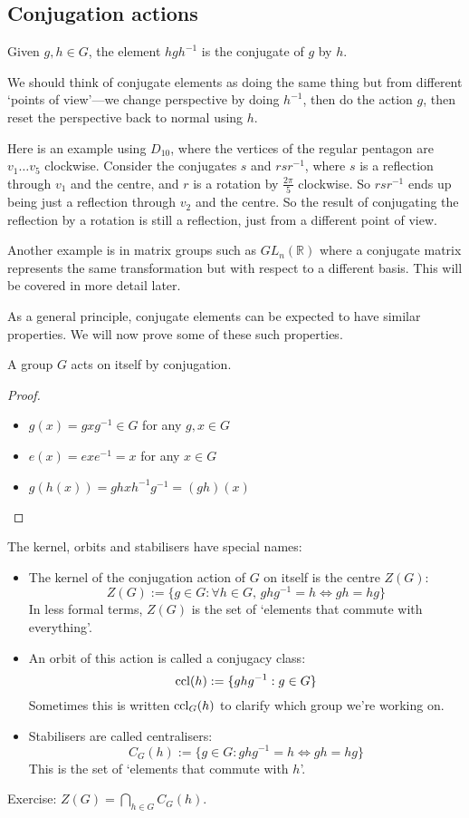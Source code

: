 \subsection{Conjugation actions}
\begin{definition}
	Given \(g, h \in G\), the element \(hgh^{-1}\) is the conjugate of \(g\) by \(h\).
\end{definition}
We should think of conjugate elements as doing the same thing but from different `points of view'---we change perspective by doing \(h^{-1}\), then do the action \(g\), then reset the perspective back to normal using \(h\).

Here is an example using \(D_{10}\), where the vertices of the regular pentagon are \(v_1 \dots v_5\) clockwise.
Consider the conjugates \(s\) and \(rsr^{-1}\), where \(s\) is a reflection through \(v_1\) and the centre, and \(r\) is a rotation by \(\frac{2\pi}{5}\) clockwise.
So \(rsr^{-1}\) ends up being just a reflection through \(v_2\) and the centre.
So the result of conjugating the reflection by a rotation is still a reflection, just from a different point of view.

Another example is in matrix groups such as \(GL_n(\mathbb R)\) where a conjugate matrix represents the same transformation but with respect to a different basis.
This will be covered in more detail later.

As a general principle, conjugate elements can be expected to have similar properties.
We will now prove some of these such properties.
\begin{proposition}
	A group \(G\) acts on itself by conjugation.
\end{proposition}
\begin{proof}
	\begin{itemize}
		\item \(g(x) = gxg^{-1} \in G\) for any \(g, x \in G\)
		\item \(e(x) = exe^{-1} = x\) for any \(x \in G\)
		\item \(g(h(x)) = ghxh^{-1}g^{-1} = (gh)(x)\)
	\end{itemize}
\end{proof}
\begin{definition}
	The kernel, orbits and stabilisers have special names:
	\begin{itemize}
		\item The kernel of the conjugation action of \(G\) on itself is the centre \(Z(G)\):
		      \[
			      Z(G) := \{ g \in G : \forall h \in G,\, ghg^{-1} = h \iff gh=hg \}
		      \]
		      In less formal terms, \(Z(G)\) is the set of `elements that commute with everything'.
		\item An orbit of this action is called a conjugacy class:
		      \[
			      \operatorname{ccl}(h) := \{ ghg^{-1}: g \in G \}
		      \]
		      Sometimes this is written \(\operatorname{ccl}_G(h)\) to clarify which group we're working on.
		\item Stabilisers are called centralisers:
		      \[
			      C_G(h) := \{ g \in G : ghg^{-1} = h \iff gh = hg \}
		      \]
		      This is the set of `elements that commute with \(h\)'.
	\end{itemize}
\end{definition}
Exercise: \(Z(G) = \bigcap_{h \in G} C_G(h)\).

